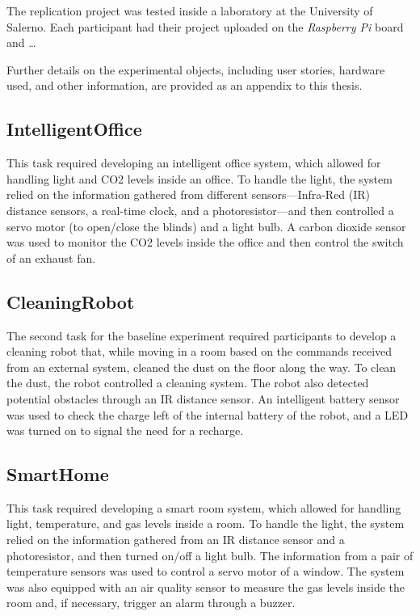 The replication project was tested inside a laboratory at the University of Salerno. Each participant had their project uploaded on the \textit{Raspberry Pi} board and \dots

Further details on the experimental objects, including user stories, hardware used, and other information, are provided as an appendix to this thesis.

\subsection{IntelligentOffice}
This task required developing an intelligent office system, which allowed for handling light and CO2 levels inside an office. To handle the light, the system relied on the information gathered from different sensors---\ie Infra-Red (IR) distance sensors, a real-time clock, and a photoresistor---and then controlled a servo motor (to open/close the blinds) and a light bulb. A carbon dioxide sensor was used to monitor the CO2 levels inside the office and then control the switch of an exhaust fan.

\subsection{CleaningRobot}
The second task for the baseline experiment required participants to develop a cleaning robot that, while moving in a room based on the commands received from an external system, cleaned the dust on the floor along the way. To clean the dust, the robot controlled a cleaning system. The robot also detected potential obstacles through an IR distance sensor. An intelligent battery sensor was used to check the charge left of the internal battery of the robot, and a LED was turned on to signal the need for a recharge.

\subsection{SmartHome}
This task required developing a smart room system, which allowed for handling light, temperature, and gas levels inside a room. To handle the light, the system relied on the information gathered from an IR distance sensor and a photoresistor, and then turned on/off a light bulb. The information from a pair of temperature sensors was used to control a servo motor of a window. The system was also equipped with an air quality sensor to measure the gas levels inside the room and, if necessary, trigger an alarm through a buzzer. 





